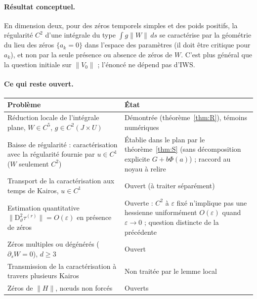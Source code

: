 \documentclass[11pt,a4paper]{article}
\theoremstyle{remark}
\newcommand{\vth}{\vartheta}
\newcommand{\D}{\mathrm D}
\begin{document}
\paragraph{Résultat conceptuel.} En dimension deux, pour des zéros temporels simples et des poids positifs, la régularité $C^2$ d'une intégrale du type $\int g\lVert W\rVert\,ds$ se caractérise par la géométrie du lieu des zéros $\{a_k=0\}$ dans l'espace des paramètres (il doit être critique pour $a_k$), et non par la seule présence ou absence de zéros de $W$. C'est plus général que la question initiale sur $\lVert V_0\rVert$ ; l'énoncé ne dépend pas d'IWS.

\paragraph{Ce qui reste ouvert.}
\begin{center}\small
\begin{tabular}{p{7.2cm}p{6.8cm}}
\toprule
Problème & État\\\midrule
Réduction locale de l'intégrale plane, $W\in C^5$, $g\in C^2(J\times U)$ & Démontrée (théorème~\ref{thm:R}), témoins numériques\\
Baisse de régularité : caractérisation avec la régularité fournie par $u\in C^1$ ($W$ seulement $C^2$) & Établie dans le plan par le théorème~\ref{thm:S} (sans décomposition explicite $G+b\Phi(a)$) ; raccord au noyau à relire\\
Transport de la caractérisation aux temps de Kairos, $u\in C^1$ & Ouvert (à traiter séparément)\\
Estimation quantitative $\lVert\D^2_\vth\tau^{(r)}\rVert=O(\varepsilon)$ en présence de zéros & Ouverte : $C^2$ à $\varepsilon$ fixé n'implique pas une hessienne uniformément $O(\varepsilon)$ quand $\varepsilon\to0$ ; question distincte de la précédente\\
Zéros multiples ou dégénérés ($\partial_sW=0$), $d\ge3$ & Ouvert\\
Transmission de la caractérisation à travers plusieurs Kairos & Non traitée par le lemme local\\
Zéros de $\lVert H\rVert$, n\oe uds non forcés & Ouverts\\\bottomrule
\end{tabular}
\end{center}
\end{document}
